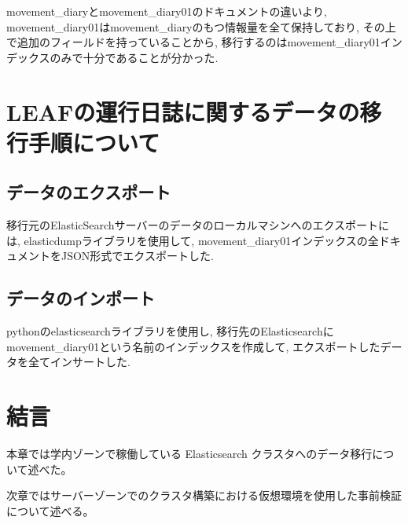 movement\_diaryとmovement\_diary01のドキュメントの違いより, movement\_diary01はmovement\_diaryのもつ情報量を全て保持しており, その上で追加のフィールドを持っていることから, 移行するのはmovement\_diary01インデックスのみで十分であることが分かった.

\section{LEAFの運行日誌に関するデータの移行手順について}

\subsection{データのエクスポート}
移行元のElasticSearchサーバーのデータのローカルマシンへのエクスポートには, elasticdumpライブラリを使用して, movement\_diary01インデックスの全ドキュメントをJSON形式でエクスポートした.

\subsection{データのインポート}
pythonのelasticsearchライブラリを使用し, 移行先のElasticsearchにmovement\_diary01という名前のインデックスを作成して, エクスポートしたデータを全てインサートした.

\section{結言}
本章では学内ゾーンで稼働している Elasticsearch クラスタへのデータ移行について述べた。

次章ではサーバーゾーンでのクラスタ構築における仮想環境を使用した事前検証について述べる。